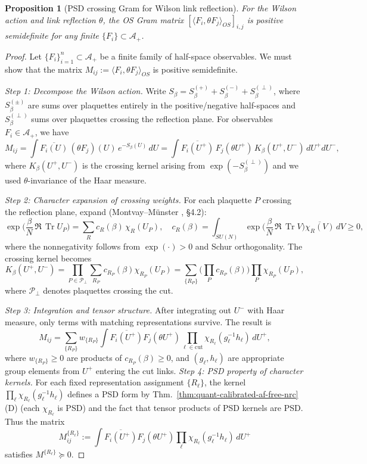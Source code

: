 \documentclass[11pt]{amsart}
\theoremstyle{plain}
\newtheorem{proposition}[theorem]{Proposition}
\theoremstyle{definition}
\theoremstyle{remark}
\renewcommand{\tfrac}[2]{\textstyle\frac{#1}{#2}}
\begin{document}
\begin{proposition}[PSD crossing Gram for Wilson link reflection]\label{prop:psd-crossing-gram}
For the Wilson action and link reflection $\theta$, the OS Gram matrix $[\langle F_i,\theta F_j\rangle_{OS}]_{i,j}$ is positive semidefinite for any finite $\{F_i\}\subset\mathcal A_+$.
\end{proposition}
\begin{proof}
Let $\{F_i\}_{i=1}^n \subset \mathcal A_+$ be a finite family of half-space observables. We must show that the matrix $M_{ij} := \langle F_i, \theta F_j \rangle_{OS}$ is positive semidefinite.

\emph{Step 1: Decompose the Wilson action.} Write $S_\beta = S_\beta^{(+)} + S_\beta^{(-)} + S_\beta^{(\perp)}$, where $S_\beta^{(\pm)}$ are sums over plaquettes entirely in the positive/negative half-spaces and $S_\beta^{(\perp)}$ sums over plaquettes crossing the reflection plane. For observables $F_i \in \mathcal A_+$, we have
\[
  M_{ij} = \int \overline{F_i(U)} \, (\theta F_j)(U) \, e^{-S_\beta(U)} \, dU = \int \overline{F_i(U^+)} \, F_j(\theta U^+) \, K_\beta(U^+, U^-) \, dU^+ dU^-,
\]
where $K_\beta(U^+, U^-)$ is the crossing kernel arising from $\exp(-S_\beta^{(\perp)})$ and we used $\theta$-invariance of the Haar measure.

\emph{Step 2: Character expansion of crossing weights.} For each plaquette $P$ crossing the reflection plane, expand (Montvay--M\"unster \cite{MontvayMunster1994}, §4.2):
\[
  \exp\Big(\tfrac{\beta}{N}\,\Re\,\operatorname{Tr} U_P\Big) = \sum_{R} c_R(\beta)\,\chi_R(U_P), \quad c_R(\beta) = \int_{SU(N)} \exp\Big(\tfrac{\beta}{N}\,\Re\,\operatorname{Tr} V\Big) \overline{\chi_R(V)} \, dV \ge 0,
\]
where the nonnegativity follows from $\exp(\cdot) > 0$ and Schur orthogonality. The crossing kernel becomes
\[
  K_\beta(U^+, U^-) = \prod_{P \in \mathcal P_\perp} \sum_{R_P} c_{R_P}(\beta) \chi_{R_P}(U_P) = \sum_{\{R_P\}} \Big(\prod_{P} c_{R_P}(\beta)\Big) \prod_{P} \chi_{R_P}(U_P),
\]
where $\mathcal P_\perp$ denotes plaquettes crossing the cut.

\emph{Step 3: Integration and tensor structure.} After integrating out $U^-$ with Haar measure, only terms with matching representations survive. The result is
\[
  M_{ij} = \sum_{\{R_P\}} w_{\{R_P\}} \int \overline{F_i(U^+)} F_j(\theta U^+) \prod_{\ell \in \text{cut}} \chi_{R_\ell}(g_\ell^{-1} h_\ell) \, dU^+,
\]
where $w_{\{R_P\}} \ge 0$ are products of $c_{R_P}(\beta) \ge 0$, and $(g_\ell, h_\ell)$ are appropriate group elements from $U^+$ entering the cut links.
\emph{Step 4: PSD property of character kernels.} For each fixed representation assignment $\{R_\ell\}$, the kernel $\prod_\ell \chi_{R_\ell}(g_\ell^{-1} h_\ell)$ defines a PSD form by Thm.~\ref{thm:quant-calibrated-af-free-nrc}(D) (each $\chi_{R_\ell}$ is PSD) and the fact that tensor products of PSD kernels are PSD. Thus the matrix
\[
  M_{ij}^{\{R_\ell\}} := \int \overline{F_i(U^+)} F_j(\theta U^+) \prod_{\ell} \chi_{R_\ell}(g_\ell^{-1} h_\ell) \, dU^+
\]
satisfies $M^{\{R_\ell\}} \succeq 0$.


\end{proof}
\end{document}
